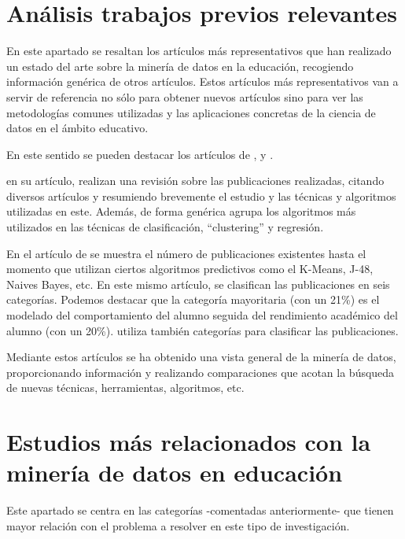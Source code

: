 \section{Análisis trabajos previos relevantes}
En este apartado se resaltan los artículos más representativos que han realizado un estado del arte sobre la minería de datos en la educación, recogiendo información genérica de otros artículos.  Estos artículos más representativos van a servir de referencia no sólo para obtener nuevos artículos sino para ver las metodologías comunes utilizadas y las aplicaciones concretas de la ciencia de datos en el ámbito educativo.

En este sentido se pueden destacar los artículos de ,  y .

 en su artículo, realizan una revisión sobre las publicaciones realizadas, citando diversos artículos y resumiendo brevemente el estudio y las técnicas y algoritmos utilizadas en este. Además, de forma genérica agrupa los algoritmos más utilizados en las técnicas de clasificación, ``clustering'' y regresión.

En el artículo de  se muestra el número de publicaciones existentes hasta el momento que utilizan ciertos algoritmos predictivos como el K-Means, J-48, Naives Bayes, etc. En este mismo artículo, se clasifican las publicaciones en seis categorías. Podemos destacar que la categoría mayoritaria (con un 21\%) es el modelado del comportamiento del alumno seguida del rendimiento académico del alumno (con un 20\%).  utiliza también categorías para clasificar las publicaciones.

Mediante estos artículos se ha obtenido una vista general de la minería de datos, proporcionando información y realizando comparaciones que acotan la búsqueda de nuevas técnicas, herramientas, algoritmos, etc.


\section{Estudios más relacionados con la minería de datos en educación}
Este apartado se centra en las categorías -comentadas anteriormente- que tienen mayor relación con el problema a resolver en este tipo de investigación. %

